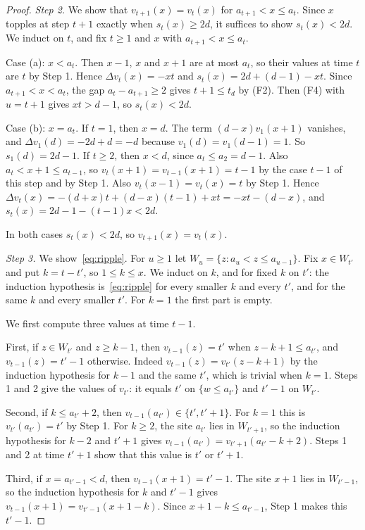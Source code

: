 \documentclass[12pt]{amsart}
\begin{document}
\begin{proof}
        \emph{Step 2.} We show that $v_{t+1}(x)=v_t(x)$ for $a_{t+1}<x\leq a_t$. Since $x$ topples at step $t+1$ exactly when $s_t(x)\geq 2d$, it suffices to show $s_t(x)<2d$. We induct on $t$, and fix $t\geq 1$ and $x$ with $a_{t+1}<x\leq a_t$.

        Case (a): $x<a_t$. Then $x-1$, $x$ and $x+1$ are at most $a_t$, so their values at time $t$ are $t$ by Step 1. Hence $\Delta v_t(x)=-xt$ and $s_t(x)=2d+(d-1)-xt$. Since $a_{t+1}<x<a_t$, the gap $a_t-a_{t+1}\geq 2$ gives $t+1\leq t_d$ by (F2). Then (F4) with $u=t+1$ gives $xt>d-1$, so $s_t(x)<2d$.

        Case (b): $x=a_t$. If $t=1$, then $x=d$. The term $(d-x)v_1(x+1)$ vanishes, and $\Delta v_1(d)=-2d+d=-d$ because $v_1(d)=v_1(d-1)=1$. So $s_1(d)=2d-1$. If $t\geq 2$, then $x<d$, since $a_t\leq a_2=d-1$. Also $a_t<x+1\leq a_{t-1}$, so $v_t(x+1)=v_{t-1}(x+1)=t-1$ by the case $t-1$ of this step and by Step 1. Also $v_t(x-1)=v_t(x)=t$ by Step 1. Hence $\Delta v_t(x)=-(d+x)t+(d-x)(t-1)+xt=-xt-(d-x)$, and $s_t(x)=2d-1-(t-1)x<2d$.

        In both cases $s_t(x)<2d$, so $v_{t+1}(x)=v_t(x)$.

        \emph{Step 3.} We show~\eqref{eq:ripple}. For $u\geq1$ let $W_u=\{z: a_u<z\leq a_{u-1}\}$. Fix $x\in W_{t'}$ and put $k=t-t'$, so $1\leq k\leq x$. We induct on $k$, and for fixed $k$ on $t'$: the induction hypothesis is~\eqref{eq:ripple} for every smaller $k$ and every $t'$, and for the same $k$ and every smaller $t'$. For $k=1$ the first part is empty.

        We first compute three values at time $t-1$.

        First, if $z\in W_{t'}$ and $z\geq k-1$, then $v_{t-1}(z)=t'$ when $z-k+1\leq a_{t'}$, and $v_{t-1}(z)=t'-1$ otherwise. Indeed $v_{t-1}(z)=v_{t'}(z-k+1)$ by the induction hypothesis for $k-1$ and the same $t'$, which is trivial when $k=1$. Steps 1 and 2 give the values of $v_{t'}$: it equals $t'$ on $\{w\leq a_{t'}\}$ and $t'-1$ on $W_{t'}$.

        Second, if $k\leq a_{t'}+2$, then $v_{t-1}(a_{t'})\in\{t',t'+1\}$. For $k=1$ this is $v_{t'}(a_{t'})=t'$ by Step 1. For $k\geq 2$, the site $a_{t'}$ lies in $W_{t'+1}$, so the induction hypothesis for $k-2$ and $t'+1$ gives $v_{t-1}(a_{t'})=v_{t'+1}(a_{t'}-k+2)$. Steps 1 and 2 at time $t'+1$ show that this value is $t'$ or $t'+1$.

        Third, if $x=a_{t'-1}<d$, then $v_{t-1}(x+1)=t'-1$. The site $x+1$ lies in $W_{t'-1}$, so the induction hypothesis for $k$ and $t'-1$ gives $v_{t-1}(x+1)=v_{t'-1}(x+1-k)$. Since $x+1-k\leq a_{t'-1}$, Step 1 makes this $t'-1$.


\end{proof}
\end{document}
